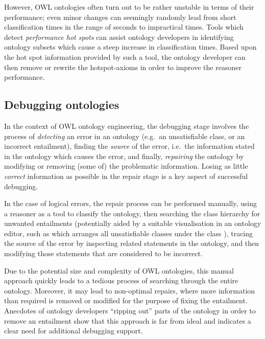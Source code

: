 However, OWL ontologies often turn out to be rather unstable in terms of their performance; even minor changes can seemingly randomly lead from short classification times in the range of seconds to impractical times. Tools which detect  \emph{performance hot spots} \cite{lin08xi,goncalves12uq} can assist ontology developers in identifying ontology subsets which cause a steep increase in classification times. Based upon the hot spot information provided by such a tool, the ontology developer can then remove or rewrite the hotspot-axioms in order to improve the reasoner performance. 

\subsection{Debugging ontologies}

In the context of OWL ontology engineering, the debugging stage involves the process of \emph{detecting} an error in an ontology (e.g.\ an unsatisfiable class, or an incorrect entailment), finding the \emph{source} of the error, i.e.\ the information stated in the ontology which causes the error, and finally, \emph{repairing} the ontology by modifying or removing (some of) the problematic information. Losing as little \emph{correct} information as possible in the repair stage is a key aspect of successful debugging.

In the case of logical errors, the repair process can be performed manually, using a reasoner as a tool to classify the ontology, then searching the class hierarchy for unwanted entailments (potentially aided by a suitable visualisation in an ontology editor, such as \protege which arranges all unsatisfiable classes under the class ), tracing the source of the error by inspecting related statements in the ontology, and then modifying those statements that are considered to be incorrect. 

Due to the potential size and complexity of OWL ontologies, this manual approach quickly leads to a tedious process of searching through the entire ontology. Moreover, it may lead to non-optimal repairs, where more information than required is removed or modified for the purpose of fixing the entailment. Anecdotes of ontology developers \enquote{ripping out} parts of the ontology in order to remove an entailment show that this approach is far from ideal and indicates a clear need for additional debugging support.

